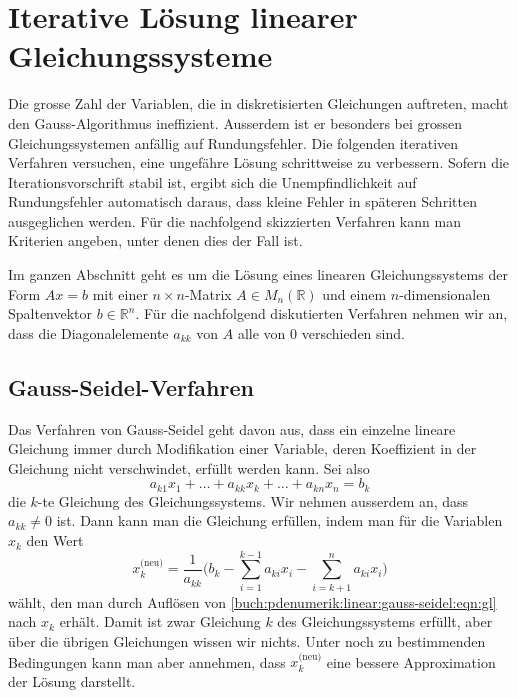 %
%
\section{Iterative Lösung linearer Gleichungssysteme
\label{buch:pdenumerik:section:linear}}
%
Die grosse Zahl der Variablen, die in diskretisierten Gleichungen auftreten,
macht den Gauss-Algorithmus ineffizient.
Ausserdem ist er besonders bei grossen Gleichungssystemen anfällig auf
Rundungsfehler.
Die folgenden iterativen Verfahren versuchen, eine ungefähre Lösung
schrittweise zu verbessern.
Sofern die Iterationsvorschrift stabil ist, ergibt sich die Unempfindlichkeit
auf Rundungsfehler automatisch daraus, dass kleine Fehler in späteren
Schritten ausgeglichen werden.
Für die nachfolgend skizzierten Verfahren kann man Kriterien angeben,
unter denen dies der Fall ist.

Im ganzen Abschnitt geht es um die Lösung eines linearen Gleichungssystems
der Form $Ax=b$ mit einer $n\times n$-Matrix $A\in M_n(\mathbb{R})$ und
einem $n$-dimensionalen Spaltenvektor $b\in\mathbb{R}^n$.
Für die nachfolgend diskutierten Verfahren nehmen wir an, dass die
Diagonalelemente $a_{kk}$ von $A$ alle von $0$ verschieden sind.

%
%
\subsection{Gauss-Seidel-Verfahren
\label{buch:pdenumerik:linear:subsection:gauss-seidel}}
Das Verfahren von Gauss-Seidel geht davon aus, dass ein einzelne lineare
%
Gleichung immer durch Modifikation einer Variable, deren Koeffizient in
der Gleichung nicht verschwindet, erfüllt werden kann.
Sei also
\begin{equation}
a_{k1}x_1 + \dots + a_{kk}x_k + \dots + a_{kn}x_n = b_k
\label{buch:pdenumerik:linear:gauss-seidel:eqn:gl}
\end{equation}
die $k$-te Gleichung des Gleichungssystems.
Wir nehmen ausserdem an, dass $a_{kk}\ne 0$ ist.
Dann kann man die Gleichung erfüllen, indem man für die Variablen $x_k$
den Wert
\begin{equation}
x_k^{\text{(neu)}}
=
\frac{1}{a_{kk}}
\biggl(
b_k
-
\sum_{i=1}^{k-1}a_{ki}x_i
-
\sum_{i=k+1}^na_{ki}x_i
\biggr)
\label{buch:pdenumerik:linear:gauss-seidel:eqn:schritt}
\end{equation}
wählt, den man durch Auflösen von
\eqref{buch:pdenumerik:linear:gauss-seidel:eqn:gl}
nach $x_k$ erhält.
Damit ist zwar Gleichung $k$ des Gleichungssystems erfüllt, aber über die
übrigen Gleichungen wissen wir nichts.
Unter noch zu bestimmenden Bedingungen kann man aber annehmen, dass 
$x_k^{\text{(neu)}}$ eine bessere Approximation der Lösung darstellt.

